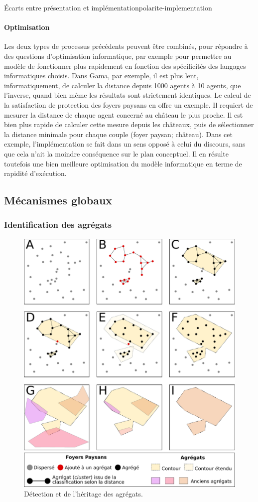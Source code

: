 \begin{encadre}{Écarts entre présentation et implémentation}{polarite-implementation}
\paragraph{Optimisation} Les deux types de processus précédents peuvent être combinés, pour répondre à des questions d'optimisation informatique, par exemple pour permettre au modèle de fonctionner plus rapidement en fonction des spécificités des langages informatiques choisis.
Dans Gama, par exemple, il est plus lent, informatiquement, de calculer la distance depuis 1000 agents à 10 agents, que l'inverse, quand bien même les résultats sont strictement identiques.
Le calcul de la satisfaction de protection des foyers paysans en offre un exemple.
Il requiert de mesurer la distance de chaque agent concerné au château le plus proche.
Il est bien plus rapide de calculer cette mesure depuis les châteaux, puis de sélectionner la distance minimale pour chaque couple (foyer paysan; château).
Dans cet exemple, l'implémentation se fait dans un sens opposé à celui du discours, sans que cela n'ait la moindre conséquence sur le plan conceptuel.
Il en résulte toutefois une bien meilleure optimisation du modèle informatique en terme de rapidité d'exécution.
\end{encadre}

\subsection{Mécanismes globaux}

\subsubsection{Identification des agrégats \label{sssec:agregats}}
	
\begin{figure}[H]
	\centering
	\includegraphics[width=.75\linewidth]{img/detection_agregats.pdf}
	\caption{Détection et de l'héritage des agrégats.}
	\label{fig:detection-agregats}
\end{figure}

